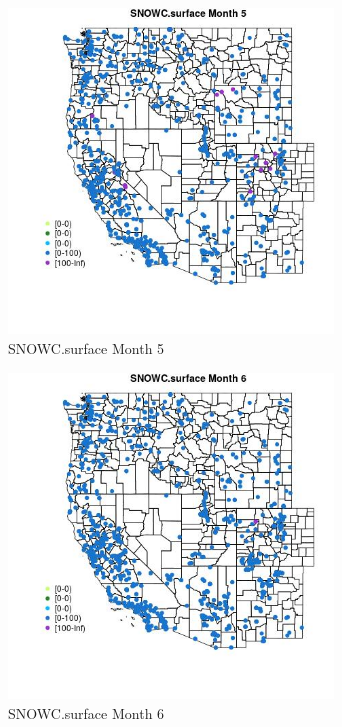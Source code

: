 \begin{figure} 
\centering  
\includegraphics[width=0.77\textwidth]{Code_Outputs/Report_ML_input_PM25_Step4_part_f_de_duplicated_aves_prioritize_24hr_obswNAs_MapObsMo5SNOWCsurface.jpg} 
\caption{\label{fig:Report_ML_input_PM25_Step4_part_f_de_duplicated_aves_prioritize_24hr_obswNAsMapObsMo5SNOWCsurface}SNOWC.surface Month 5} 
\end{figure} 
 

\begin{figure} 
\centering  
\includegraphics[width=0.77\textwidth]{Code_Outputs/Report_ML_input_PM25_Step4_part_f_de_duplicated_aves_prioritize_24hr_obswNAs_MapObsMo6SNOWCsurface.jpg} 
\caption{\label{fig:Report_ML_input_PM25_Step4_part_f_de_duplicated_aves_prioritize_24hr_obswNAsMapObsMo6SNOWCsurface}SNOWC.surface Month 6} 
\end{figure} 
 

